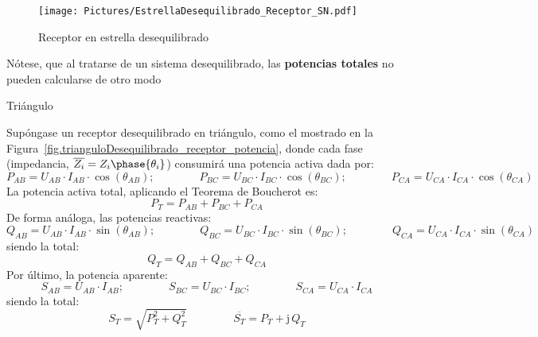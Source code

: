 \documentclass[11pt]{book} %
\makeatletter
\numberwithin{dummy}{section}
\theoremstyle{ocrenumbox}
\theoremstyle{blacknumex}
\theoremstyle{blacknumbox}
\theoremstyle{ocrenum}
\newenvironment{remark}{\par\vspace{10pt}\small %
\begin{list}{}{
\leftmargin=35pt %
\rightmargin=25pt}\item\ignorespaces %
\makebox[-2.5pt]{\begin{tikzpicture}[overlay]
\node[draw=ocre!60,line width=1pt,circle,fill=ocre!25,font=\sffamily\bfseries,inner sep=2pt,outer sep=0pt] at (-15pt,0pt){\textcolor{ocre}{N}};\end{tikzpicture}} %
\advance\baselineskip -1pt}{\end{list}\vskip5pt} %
\renewcommand{\subsubsection}{\@startsection {subsubsection}{3}{\z@}
{-2ex \@plus -0.1ex \@minus -.2ex}
{.2ex \@plus.2ex }
{\normalfont\small\sffamily\bfseries}}
\newlength\esp
\makeatother
\begin{document}
	\begin{figure}[htbp]
	    \centering
	    \texttt{[image: Pictures/EstrellaDesequilibrado\_Receptor\_SN.pdf]}
	    \caption{Receptor en estrella desequilibrado}
	    \label{fig.estrellaDesequilibrado_potencia}
	\end{figure}
	
	\begin{remark}
	    Nótese, que al tratarse de un sistema desequilibrado, las \textbf{potencias totales} no pueden calcularse de otro modo
	\end{remark}
	
	\subsubsection{Triángulo}
	
	Supóngase un receptor desequilibrado en triángulo, como el mostrado en la Figura~\ref{fig.trianguloDesequilibrado_receptor_potencia}, donde cada fase (impedancia, $\overline{Z_i}=Z_i\phase{\theta_i}$) consumirá una potencia activa dada por: 
	\begin{equation*}
	    P_{AB}=U_{AB}\cdot I_{AB} \cdot \cos(\theta_{AB});\qquad \qquad
	    P_{BC}=U_{BC}\cdot I_{BC} \cdot \cos(\theta_{BC});\qquad \qquad
	    P_{CA}=U_{CA}\cdot I_{CA} \cdot \cos(\theta_{CA})
	\end{equation*}
	La potencia activa total, aplicando el Teorema de Boucherot es:
	\begin{equation}
	    \boxed{P_T=P_{AB}+P_{BC}+P_{CA}}
	\end{equation}
	De forma análoga, las potencias reactivas:
	\begin{equation*}
	    Q_{AB}=U_{AB}\cdot I_{AB} \cdot \sin(\theta_{AB});\qquad \qquad
	    Q_{BC}=U_{BC}\cdot I_{BC} \cdot \sin(\theta_{BC});\qquad \qquad
	    Q_{CA}=U_{CA}\cdot I_{CA} \cdot \sin(\theta_{CA})
	\end{equation*}
	siendo la total: 
	\begin{equation}
	    \boxed{Q_T=Q_{AB}+Q_{BC}+Q_{CA}}
	\end{equation}
	Por último, la potencia aparente: 
	\begin{equation*}
	    S_{AB}=U_{AB}\cdot I_{AB};\qquad \qquad
	    S_{BC}=U_{BC}\cdot I_{BC};\qquad \qquad
	    S_{CA}=U_{CA}\cdot I_{CA}
	\end{equation*}
	siendo la total: 
	\begin{equation}
	    \boxed{S_T=\sqrt{P_T^2+Q_T^2}}\,\qquad\qquad \boxed{\overline{S_T}=P_T+\mathrm{j}\,Q_T}
	\end{equation}
	
\end{document}
